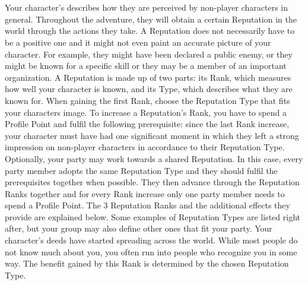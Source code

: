 \documentclass[a4paper, titlepage, 11pt, twocolumn] {article}
\begin{document}
%
\clearpage
%
%
\vfill
%
\\\\
%
Your character's  describes how they are perceived by non-player characters in general.
Throughout the adventure, they will obtain a certain Reputation in the world through the actions they take.
A Reputation does not necessarily have to be a positive one and it might not even paint an accurate picture of your character.
For example, they might have been declared a public enemy, or they might be known for a specific skill or they may be a member of an important organization.
A Reputation is made up of two parts: its Rank, which measures how well your character is known, and its Type, which describes what they are known for.
When gaining the first Rank, choose the Reputation Type that fits your characters image.
To increase a Reputation's Rank, you have to spend a Profile Point and fulfil the following prerequisite: since the last Rank increase, your character must have had one significant moment in which they left a strong impression on non-player characters in accordance to their Reputation Type.
Optionally, your party may work towards a shared Reputation.
In this case, every party member adopts the same Reputation Type and they should fulfil the prerequisites together when possible.
They then advance through the Reputation Ranks together and for every Rank increase only one party member needs to spend a Profile Point.
The 3 Reputation Ranks and the additional effects they provide are explained below.
Some examples of Reputation Types are listed right after, but your group may also define other ones that fit your party.
%
\vfill
%
 Your character's deeds have started spreading across the world. While most people do not know much about you, you often run into people who recognize you in some way. The benefit gained by this Rank is determined by the chosen Reputation Type. \ofrow
\end{document}
